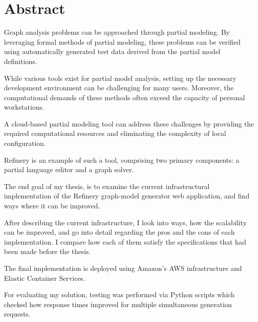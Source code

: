 \chapter*{Abstract}
	Graph analysis problems can be approached through partial modeling. 
	By leveraging formal methods of partial modeling, these problems can be verified using 
	automatically generated test data derived from the partial model definitions. 

	While various tools exist for partial model analysis, setting up the necessary development 
	environment can be challenging for many users. Moreover, the computational demands of 
	these methods often exceed the capacity of personal workstations.

	A cloud-based partial modeling tool can address these challenges by providing the required 
	computational resources and eliminating the complexity of local configuration. 
	
	Refinery 
	is an example of such a tool, comprising two primary components: a partial language editor and a graph solver.

	The end goal of my thesis, is to examine the current infrastructural implementation of the Refinery graph-model
	generator web application, and find ways where it can be improved.

	After describing the current infrastructure, I look into ways, how the scalability can be improved,
	and go into detail regarding the pros and the cons of each implementation. I compare how each of them
	satisfy the specifications that had been made before the thesis.

	The final implementation is deployed using Amazon's AWS infrastructure and Elastic Container Services. 
	
	For evaluating my solution, testing was performed via Python scripts
	which checked how response times improved for multiple simultaneous generation requests.



\vfill
\cleardoublepage

\selectthesislanguage

\setcounter{romanPage}{\value{page}}
